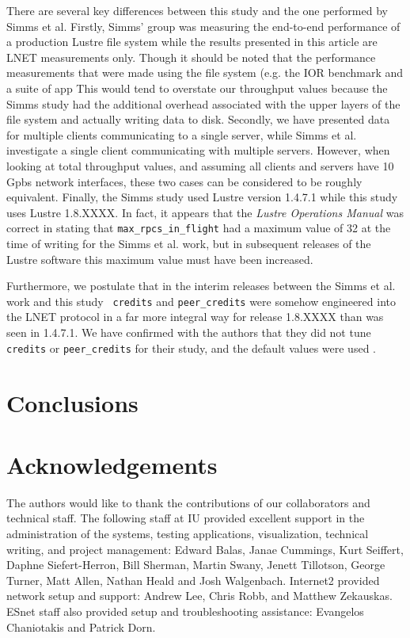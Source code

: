\documentclass[]{sigplan-proc}
\begin{document}
There are several key differences between this study and the one performed by Simms et al. Firstly, Simms'
group was measuring the end-to-end performance of a production Lustre file system while the results presented
in this article are LNET measurements only. Though it should be noted that the performance measurements that
were made using the file system (e.g. the IOR benchmark and a suite of app This would tend to overstate our throughput values because the
Simms study had the additional overhead associated with the upper layers of the file system and actually
writing data to disk. Secondly, we have presented data for multiple clients communicating to a single server,
while Simms et al. investigate a single client communicating with multiple servers. However, when looking at
total throughput values, and assuming all clients and servers have 10 Gpbs network interfaces, these two cases
can be considered to be roughly equivalent. Finally, the Simms study used Lustre version 1.4.7.1 while this
study uses Lustre 1.8.XXXX. In fact, it appears that the {\it Lustre Operations Manual} was correct in stating
that {\tt max\_rpcs\_in\_flight} had a maximum value of 32 at the time of writing for the Simms et al. work,
but in subsequent releases of the Lustre software this maximum value must have been increased. 

Furthermore, we postulate that in the interim releases between the Simms et al. work and this study {\tt
  credits} and {\tt peer\_credits} were somehow engineered into the LNET protocol in a far more integral way
for release 1.8.XXXX than was seen in 1.4.7.1. We have confirmed with the authors that they did not tune {\tt
  credits} or {\tt peer\_credits} for their study, and the default values were used \cite{simmsprivate}. 

\section{Conclusions}\label{sec:conclusion}
  
\section{Acknowledgements}

The authors would like to thank the contributions of our collaborators and technical staff. The following
staff at IU provided excellent support in the administration of the systems, testing applications,
visualization, technical writing, and project management: Edward Balas, Janae Cummings, Kurt Seiffert, Daphne
Siefert-Herron, Bill Sherman, Martin Swany, Jenett Tillotson, George Turner, Matt Allen, Nathan Heald and Josh Walgenbach. Internet2 provided network setup and support: Andrew Lee, Chris Robb, and Matthew Zekauskas. ESnet staff also provided setup and troubleshooting assistance: Evangelos Chaniotakis and Patrick Dorn.
\end{document}
